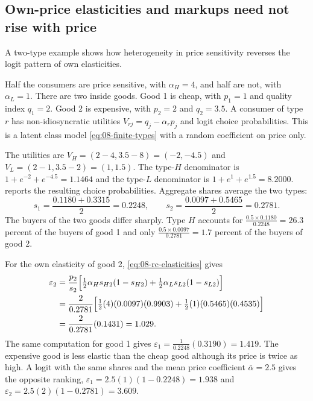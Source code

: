 \subsection{Own-price elasticities and markups need not rise with price}\label{sec:08-twotype}

A two-type example shows how heterogeneity in price sensitivity reverses the logit pattern of own elasticities.

\begin{example}\label{ex:08-twotype}
Half the consumers are price sensitive, with $\alpha_H = 4$, and half are not, with $\alpha_L = 1$. There are two
inside goods. Good 1 is cheap, with $p_1 = 1$ and quality index $q_1 = 2$. Good 2 is expensive, with $p_2 = 2$ and
$q_2 = 3.5$. A consumer of type $r$ has non-idiosyncratic utilities $V_{rj} = q_j - \alpha_r p_j$ and logit
choice probabilities. This is a latent class model \eqref{eq:08-finite-types} with a random coefficient on price
only.

The utilities are $V_H = (2 - 4, 3.5 - 8) = (-2, -4.5)$ and $V_L = (2 - 1, 3.5 - 2) = (1, 1.5)$. The type-$H$
denominator is $1 + e^{-2} + e^{-4.5} = 1.1464$ and the type-$L$ denominator is $1 + e^{1} + e^{1.5} = 8.2000$.
 reports the resulting choice probabilities. Aggregate shares average the two types:
\begin{equation*}
  s_1 = \frac{0.1180 + 0.3315}{2} = 0.2248, \qquad s_2 = \frac{0.0097 + 0.5465}{2} = 0.2781.
\end{equation*}
The buyers of the two goods differ sharply. Type $H$ accounts for
$\frac{0.5 \times 0.1180}{0.2248} = 26.3$ percent of the buyers of good 1 and only
$\frac{0.5 \times 0.0097}{0.2781} = 1.7$ percent of the buyers of good 2.

For the own elasticity of good 2, \eqref{eq:08-rc-elasticities} gives
\begin{align*}
  \varepsilon_2 &= \frac{p_2}{s_2}\Bigl[\tfrac{1}{2}\alpha_H s_{H2}(1 - s_{H2})
                      + \tfrac{1}{2}\alpha_L s_{L2}(1 - s_{L2})\Bigr] \\
                   &= \frac{2}{0.2781}\Bigl[\tfrac{1}{2}(4)(0.0097)(0.9903) + \tfrac{1}{2}(1)(0.5465)(0.4535)\Bigr]\\
                   &= \frac{2}{0.2781}(0.1431) = 1.029.
\end{align*}
The same computation for good 1 gives $\varepsilon_1 = \frac{1}{0.2248}(0.3190) = 1.419$. The expensive good
is less elastic than the cheap good although its price is twice as high. A logit with the same shares and the
mean price coefficient $\bar\alpha = 2.5$ gives the opposite ranking, $\varepsilon_1 = 2.5(1)(1 - 0.2248) =
1.938$ and $\varepsilon_2 = 2.5(2)(1 - 0.2781) = 3.609$.


\end{example}
